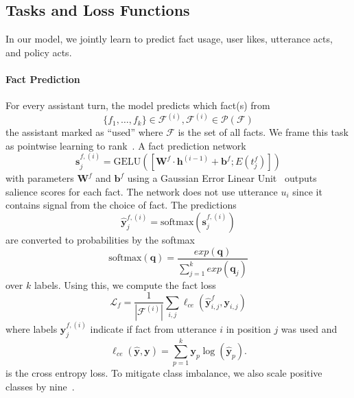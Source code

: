 \subsection{Tasks and Loss Functions}
\label{subsec:method:task}
In our model, we jointly learn to predict fact usage, user likes, utterance acts, and policy acts.
\paragraph{Fact Prediction}
For every assistant turn, the model predicts which fact(s) from
$$\{f_1,\ldots,f_k\}\in \mathcal{F}^{(i)},\mathcal{F}^{(i)}\in\mathcal{P}(\mathcal{F})$$
the assistant marked as ``used'' where $\mathcal{F}$ is the set of all facts.
We frame this task as pointwise learning to rank~\citep{Li2008LearningTR}.
A fact prediction network
\begin{equation}
    \bm{s}_{j}^{f,(i)}=\text{GELU}\left(\left[\bm{W}^f\cdot \bm{h}^{(i-1)} +\bm{b}^f;E(t_j^f)\right]\right)
\end{equation}
with parameters $\bm{W}^f$ and $\bm{b}^f$ using a Gaussian Error Linear Unit~\citep{Hendrycks2017BridgingNA} outputs salience scores for each fact.
The network does not use utterance $u_i$ since it contains signal from the choice of fact.
The predictions
\begin{equation}
    \bm{\hat{y}}^{f,(i)}_j=\text{softmax}(\bm{s}_{j}^{f,(i)})
\end{equation}
are converted to probabilities by the softmax
\begin{equation}
    \text{softmax}(\bm{q})=\frac{exp(\bm{q})}{\sum_{j=1}^k exp({\bm{q}_j})}
\end{equation}
over $k$ labels. Using this, we compute the fact loss
\begin{equation}
    \mathcal{L}_f=\frac{1}{|\mathcal{F}^{(i)}|}\sum_{i,j} \ell_{ce}(\bm{\hat{y}}^f_{i,j},\bm{y}_{i,j})
\end{equation}
where labels $\bm{y}^{f,(i)}_{j}$ indicate if fact from utterance $i$ in position $j$ was used and
\begin{equation}
    \ell_{ce}(\bm{\hat{y}},\bm{y})=\sum_{p=1}^k\bm{y}_p\log(\bm{\hat{y}}_p).
\end{equation}
is the cross entropy loss.
To mitigate class imbalance, we also scale positive classes by nine~\citep{Japkowicz2002TheCI}.

